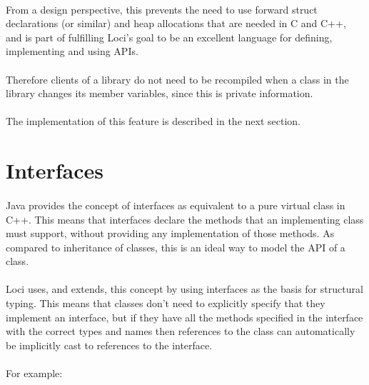 \documentclass[12pt,twoside,notitlepage]{report}
\begin{document}
\paragraph{}
From a design perspective, this prevents the need to use forward struct declarations (or similar) and heap allocations that are needed in C and C++, and is part of fulfilling Loci's goal to be an excellent language for defining, implementing and using APIs.

\paragraph{}
Therefore clients of a library do not need to be recompiled when a class in the library changes its member variables, since this is private information.

\paragraph{}
The implementation of this feature is described in the next section.

\section{Interfaces}

\paragraph{}
Java provides the concept of interfaces as equivalent to a pure virtual class in C++. This means that interfaces declare the methods that an implementing class must support, without providing any implementation of those methods. As compared to inheritance of classes, this is an ideal way to model the API of a class.

\paragraph{}
Loci uses, and extends, this concept by using interfaces as the basis for structural typing. This means that classes don't need to explicitly specify that they implement an interface, but if they have all the methods specified in the interface with the correct types and names then references to the class can automatically be implicitly cast to references to the interface.

\paragraph{}
For example:
\end{document}
